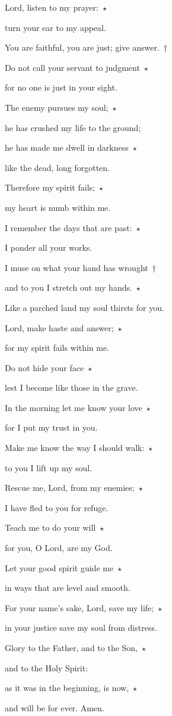 \noindent Lord, listen to my prayer:~$\star$~\nopagebreak

turn your ear to my appeal.

\noindent You are faithful, you are just; give answer.~†~\nopagebreak

Do not call your servant to judgment~$\star$~\nopagebreak

for no one is just in your sight.

\noindent The enemy pursues my soul;~$\star$~\nopagebreak

he has crushed my life to the ground;

\noindent he has made me dwell in darkness~$\star$~\nopagebreak

like the dead, long forgotten.

\noindent Therefore my spirit fails;~$\star$~\nopagebreak

my heart is numb within me.

\noindent I remember the days that are past:~$\star$~\nopagebreak

I ponder all your works.

\noindent I muse on what your hand has wrought~†~\nopagebreak

and to you I stretch out my hands.~$\star$~\nopagebreak

Like a parched land my soul thirsts for you.

\noindent Lord, make haste and answer;~$\star$~\nopagebreak

for my spirit fails within me.

\noindent Do not hide your face~$\star$~\nopagebreak

lest I become like those in the grave.

\noindent In the morning let me know your love~$\star$~\nopagebreak

for I put my trust in you.

\noindent Make me know the way I should walk:~$\star$~\nopagebreak

to you I lift up my soul.

\noindent Rescue me, Lord, from my enemies;~$\star$~\nopagebreak

I have fled to you for refuge.

\noindent Teach me to do your will~$\star$~\nopagebreak

for you, O Lord, are my God.

\noindent Let your good spirit guide me~$\star$~\nopagebreak

in ways that are level and smooth.

\noindent For your name’s sake, Lord, save my life;~$\star$~\nopagebreak

in your justice save my soul from distress.

\noindent Glory to the Father, and to the Son,~$\star$~\nopagebreak

and to the Holy Spirit:

\noindent as it was in the beginning, is now,~$\star$~\nopagebreak

and will be for ever. Amen.
